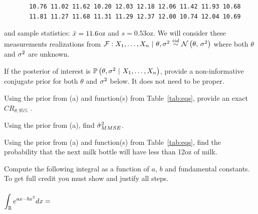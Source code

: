 \documentclass[12pt]{article}
\begin{document}
\begin{verbatim}
       10.76 11.02 11.62 10.20 12.03 12.18 12.06 11.42 11.93 10.68
       11.81 11.27 11.68 11.31 11.29 12.37 12.00 10.74 12.04 10.69
\end{verbatim}

\noindent and sample statistics: $\bar{x} = 11.6$oz and $s = 0.53$oz. We will consider these measurements realizations from $\mathcal{F} : \Xoneton~|~\theta, \sigsq \iid \normnot{\theta}{\sigsq}$ where both $\theta$ and $\sigma^2$ are unknown.
\benum


 If the posterior of interest is $\mathbb{P}\left(\theta, \sigma^2~|~X_1, \ldots, X_n\right)$, provide a non-informative conjugate prior for both $\theta$ and $\sigma^2$ below. It does not need to be proper.


 Using the prior from (a) and function(s) from Table~\ref{tab:eqs}, provide an exact $CR_{\theta, 95\%}$ .


 Using the prior from (a), find $\hat{\sigma}^2_{MMSE}$.


 Using the prior from (a) and function(s) from Table~\ref{tab:eqs}, find the probability that the next milk bottle will have less than 12oz of milk.

 Compute the following integral as a function of $a$, $b$ and fundamental constants. To get full credit you must show and justify all steps. \\~\\
$\displaystyle\int_{\mathbb{R}} e^{ax - bx^2} dx = $
\eenum
\end{document}
